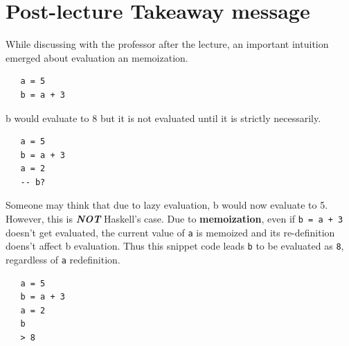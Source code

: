 \section{Post-lecture Takeaway message}
While discussing with the professor after the lecture,
an important intuition emerged about evaluation an memoization.
\begin{lstlisting}
   a = 5
   b = a + 3
\end{lstlisting}
b would evaluate to 8 but it is not evaluated until it is strictly necessarily.

\begin{lstlisting}
   a = 5
   b = a + 3
   a = 2
   -- b?
\end{lstlisting}
Someone may think that due to lazy evaluation,
b would now evaluate to 5.
However, this is \textit{\textbf{NOT}} Haskell's case.
Due to \textbf{memoization},
even if \lstinline|b = a + 3| doesn't get evaluated,
the current value of \texttt{a} is memoized and its re-definition doens't affect b evaluation.
Thus this snippet code leads \texttt{b} to be evaluated as \texttt{8},
regardless of \texttt{a} redefinition.
\begin{lstlisting}
   a = 5
   b = a + 3
   a = 2
   b
   > 8
\end{lstlisting}
